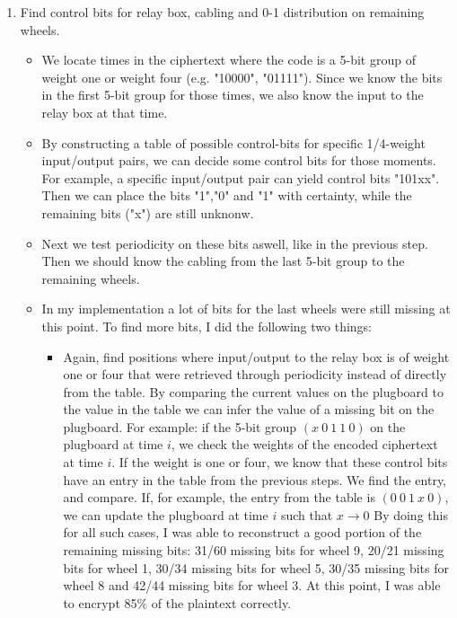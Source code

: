 \documentclass{article}
\begin{document}
\begin{enumerate}
\begin{itemize}
    \end{itemize}
    \item Find control bits for relay box, cabling and 0-1 distribution on remaining wheels.
    \begin{itemize}
        \item We locate times in the ciphertext where the code is a 5-bit group of weight one or weight four (e.g. "10000", "01111").
        Since we know the bits in the first 5-bit group for those times, we also know the input to the relay box at that time.
        \item By constructing a table of possible control-bits for specific 1/4-weight input/output pairs,
        we can decide some control bits for those moments. For example, a specific input/output pair can yield 
        control bits "101xx". Then we can place the bits "1","0" and "1" with certainty, while the remaining bits ("x") are still unknonw.
        \item Next we test periodicity on these bits aswell, like in the previous step. 
        Then we should know the cabling from the last 5-bit group to the remaining wheels.
        \item In my implementation a lot of bits for the last wheels were still missing at this point.
        To find more bits, I did the following two things:
        \begin{itemize}
            \item Again, find positions where input/output to the relay box is of weight one or four that were retrieved through 
            periodicity instead of directly from the table. By comparing the current values on the plugboard to the value in the table
            we can infer the value of a missing bit on the plugboard. For example: if the 5-bit group $(x\ 0\ 1\ 1\ 0)$
            on the plugboard at time $i$, we check the weights of the encoded ciphertext at time $i$. If the weight is one or four,
            we know that these control bits have an entry in the table from the previous steps. We find the entry, and compare.
            If, for example, the entry from the table is $(0\ 0\ 1\ x\ 0)$, we can update the plugboard at time $i$ such that $x \rightarrow 0$
            By doing this for all such cases, I was able to reconstruct a good portion of the remaining missing bits: 
            31/60 missing bits for wheel 9, 20/21 missing bits for wheel 1, 30/34 missing bits for wheel 5, 30/35 missing bits for wheel 8 and 42/44 missing bits for wheel 3.
            At this point, I was able to encrypt 85$\%$ of the plaintext correctly.

\end{itemize}
\end{itemize}
\end{enumerate}
\end{document}
